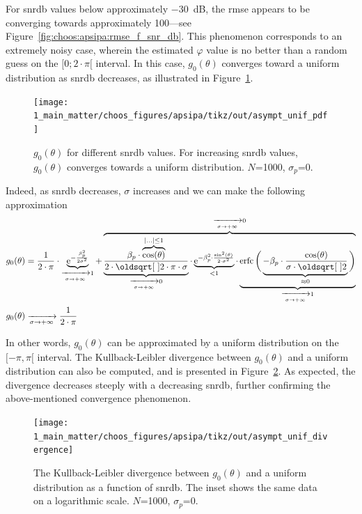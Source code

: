 For \gls{snrdb} values below approximately $-30$~dB, the \gls{rmse} appears to be converging towards approximately 100{\degree}---see Figure~\ref{fig:choos:apsipa:rmse_f_snr_db}. This phenomenon corresponds to an extremely noisy case, wherein the estimated $\varphi$ value is no better than a random guess on the $[0;2\cdot \pi[$ interval. In this case, $g_0(\theta)$ converges toward a uniform distribution as \gls{snrdb} decreases, as illustrated in Figure~\ref{fig:choos:apsipa:pdf_g_uniform}.

\begin{figure}
	\centering
	\texttt{[image: 1\_main\_matter/choos\_figures/apsipa/tikz/out/asympt\_unif\_pdf]}
	\caption{$g_0(\theta)$ for different \gls{snrdb} values. For increasing \gls{snrdb} values, $g_0(\theta)$ converges towards a uniform distribution. $N$=1000, $\sigma_p$=0.}
	\label{fig:choos:apsipa:pdf_g_uniform}
\end{figure}

Indeed, as \gls{snrdb} decreases, $\sigma$ increases and we can make the following approximation
\begin{equation}
	\begin{aligned}
		&g_0(\theta) = \frac{1}{2\cdot \pi} \cdot \underbrace{\e^{-\frac{\beta_p^2}{2 \sigma^2}}}_{\xrightarrow[\sigma \rightarrow + \infty]{} 1} + \overbrace{\underbrace{\frac{\beta_p \cdot \overbrace{\cos(\theta)}^{|...| \leq 1}}{2 \cdot \sqrt{2 \cdot \pi} \cdot \sigma}}_{\xrightarrow[\sigma \rightarrow + \infty]{} 0} \cdot \underbrace{\e^{-\beta_p^2 \cdot \frac{\sin^2(\theta)}{2\cdot \sigma^2}}}_{< 1} \cdot \underbrace{\erfc\bigg(\underbrace{- \beta_p \cdot \frac{\cos(\theta)}{\sigma \cdot \sqrt{2}}}_{\approx 0}\bigg)}_{\xrightarrow[\sigma \rightarrow + \infty]{} 1}}^{\xrightarrow[\sigma \rightarrow + \infty]{} 0} \\
		& g_0(\theta) \xrightarrow[\sigma \rightarrow + \infty]{} \frac{1}{2 \cdot \pi}
	\end{aligned}
\end{equation}

In other words, $g_0(\theta)$ can be approximated by a uniform distribution on the $[-\pi, \pi[$ interval. The Kullback-Leibler divergence between $g_0(\theta)$ and a uniform distribution can also be computed, and is presented in Figure~\ref{fig:choos:apsipa:bhata_dist_uniform}. As expected, the divergence decreases steeply with a decreasing \gls{snrdb}, further confirming the above-mentioned convergence phenomenon.

\begin{figure}
	\centering
	\texttt{[image: 1\_main\_matter/choos\_figures/apsipa/tikz/out/asympt\_unif\_divergence]}
	\caption{The Kullback-Leibler divergence between $g_0(\theta)$ and a uniform distribution as a function of \gls{snrdb}. The inset shows the same data on a logarithmic scale. $N$=1000, $\sigma_p$=0.}
	\label{fig:choos:apsipa:bhata_dist_uniform}
\end{figure}

